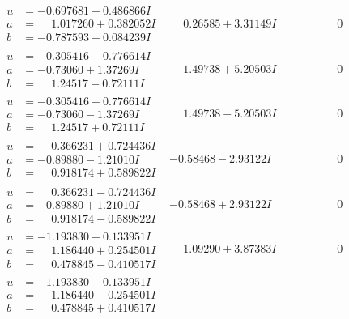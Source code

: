 \documentclass[1p]{elsarticle_modified}
\theoremstyle{definition}
\begin{document}
$$\begin{array}{c|c|c}
\begin{aligned}
u &= -0.697681 - 0.486866 I \\
a &= \phantom{-}1.017260 + 0.382052 I \\
b &= -0.787593 + 0.084239 I\end{aligned}
 & \phantom{-}0.26585 + 3.31149 I & \phantom{-0.000000 } 0 \\ \hline\begin{aligned}
u &= -0.305416 + 0.776614 I \\
a &= -0.73060 + 1.37269 I \\
b &= \phantom{-}1.24517 - 0.72111 I\end{aligned}
 & \phantom{-}1.49738 + 5.20503 I & \phantom{-0.000000 } 0 \\ \hline\begin{aligned}
u &= -0.305416 - 0.776614 I \\
a &= -0.73060 - 1.37269 I \\
b &= \phantom{-}1.24517 + 0.72111 I\end{aligned}
 & \phantom{-}1.49738 - 5.20503 I & \phantom{-0.000000 } 0 \\ \hline\begin{aligned}
u &= \phantom{-}0.366231 + 0.724436 I \\
a &= -0.89880 - 1.21010 I \\
b &= \phantom{-}0.918174 + 0.589822 I\end{aligned}
 & -0.58468 - 2.93122 I & \phantom{-0.000000 } 0 \\ \hline\begin{aligned}
u &= \phantom{-}0.366231 - 0.724436 I \\
a &= -0.89880 + 1.21010 I \\
b &= \phantom{-}0.918174 - 0.589822 I\end{aligned}
 & -0.58468 + 2.93122 I & \phantom{-0.000000 } 0 \\ \hline\begin{aligned}
u &= -1.193830 + 0.133951 I \\
a &= \phantom{-}1.186440 + 0.254501 I \\
b &= \phantom{-}0.478845 - 0.410517 I\end{aligned}
 & \phantom{-}1.09290 + 3.87383 I & \phantom{-0.000000 } 0 \\ \hline\begin{aligned}
u &= -1.193830 - 0.133951 I \\
a &= \phantom{-}1.186440 - 0.254501 I \\
b &= \phantom{-}0.478845 + 0.410517 I\end{aligned}

\end{array}$$
\end{document}
